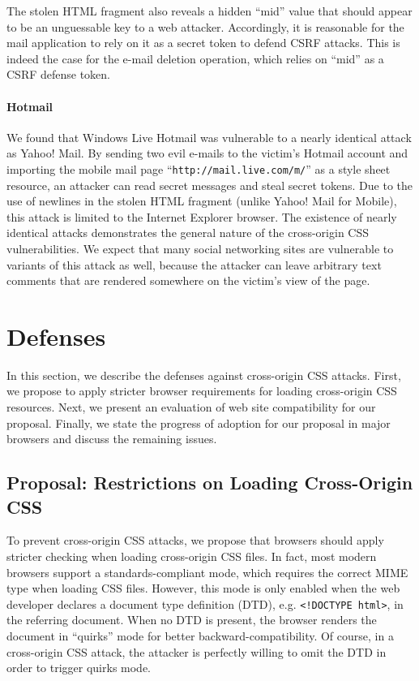 \documentclass{acm_proc_article-sp}
\begin{document}
The stolen HTML fragment also reveals a hidden ``mid'' value that should appear to be an unguessable key to a web attacker. Accordingly, it is reasonable for the mail application to rely on it as a secret token to defend CSRF attacks. This is indeed the case for the e-mail deletion operation, which relies on ``mid'' as a CSRF defense token.

\paragraph{Hotmail}
We found that Windows Live Hotmail was vulnerable to a nearly identical attack as Yahoo! Mail. By sending two evil e-mails to the victim's Hotmail account and importing the mobile mail page ``\texttt{http://mail.live.com/m/}'' as a style sheet resource, an attacker can read secret messages and steal secret tokens. Due to the use of newlines in the stolen HTML fragment (unlike Yahoo! Mail for Mobile), this attack is limited to the Internet Explorer browser.
The existence of nearly identical attacks demonstrates the general nature of the cross-origin CSS vulnerabilities. We expect that many social networking sites are vulnerable to variants of this attack as well, because the attacker can leave arbitrary text comments that are rendered somewhere on the victim's view of the page.

\section{Defenses} \label{sec:defenses}
In this section, we describe the defenses against cross-origin CSS attacks.
First, we propose to apply stricter browser requirements for loading
cross-origin CSS resources. Next, we present an evaluation of web site
compatibility for our proposal. Finally, we state the progress of adoption for
our proposal in major browsers and discuss the remaining issues.

\subsection{Proposal: Restrictions on Loading Cross-Origin CSS} \label{sec:proposal}
To prevent cross-origin
CSS attacks, we propose that browsers should apply stricter checking when
loading cross-origin CSS files. In fact, most modern browsers support a
standards-compliant mode, which requires the correct MIME type when loading CSS
files. However, this mode is only enabled when the web developer declares a
document type definition (DTD), e.g. \verb|<!DOCTYPE html>|, in the referring
document. When no DTD is present, the browser renders the document in
``quirks'' mode for better backward-compatibility. Of course, in a
cross-origin CSS attack, the attacker is perfectly willing to omit the DTD in
order to trigger quirks mode.
\end{document}
